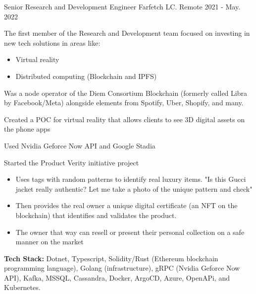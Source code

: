 \begin{cventries}
  \cventry
    {Senior Research and Development Engineer} %
    {Farfetch LC.} %
    {Remote} %
    {2021 - May. 2022} %
    {
      \begin{cvitems} %
        \item {The first member of the Research and Development team focused on investing in new tech solutions in areas like:}
        \begin{itemize}
         \item Virtual reality
         \item Distributed computing (Blockchain and IPFS)
        \end{itemize}
        \item {Was a node operator of the Diem Consortium Blockchain (formerly called Libra by Facebook/Meta) alongside elements from Spotify, Uber, Shopify, and many.}
        \item {Created a POC for virtual reality that allows clients to see 3D digital assets on the phone apps}
        \item {Used Nvidia Geforce Now API and Google Stadia}
        \item {Started the Product Verity initiative project}
        \begin{itemize}
         \item Uses tags with random patterns to identify real luxury items. "Is this Gucci jacket really authentic? Let me take a photo of the unique pattern and check"
         \item Then provides the real owner a unique digital certificate (an NFT on the blockchain) that identifies and validates the product.
         \item The owner that way can resell or present their personal collection on a safe manner on the market
        \end{itemize}
        \item {\textbf{Tech Stack:} Dotnet, Typescript, Solidity/Rust (Ethereum blockchain programming language), Golang (infrastructure), gRPC (Nvidia Geforce Now API), Kafka, MSSQL, Cassandra, Docker, ArgoCD, Azure, OpenAPi, and Kubernetes.}
      \end{cvitems}
    }


\end{cventries}
